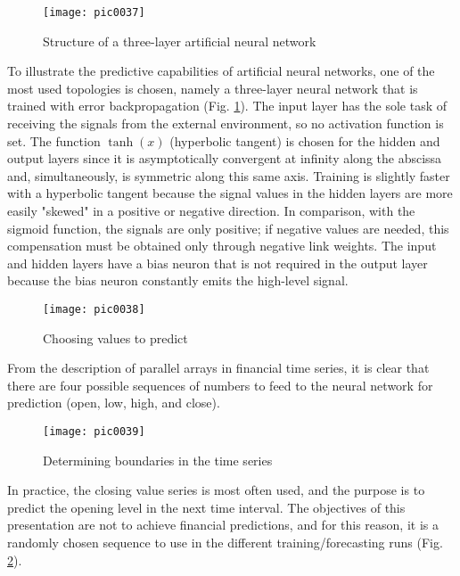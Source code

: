 \begin{figure}[h]
\centering
\texttt{[image: pic0037]}
\caption{Structure of a three-layer artificial neural network}
\label{fig:pic0037}
\end{figure}
\FloatBarrier

To illustrate the predictive capabilities of artificial neural networks, one of the most used topologies is chosen, namely a three-layer neural network that is trained with error backpropagation (Fig. \ref{fig:pic0037}). The input layer has the sole task of receiving the signals from the external environment, so no activation function is set. The function $\tanh( x )$ (hyperbolic tangent) is chosen for the hidden and output layers since it is asymptotically convergent at infinity along the abscissa and, simultaneously, is symmetric along this same axis. Training is slightly faster with a hyperbolic tangent because the signal values in the hidden layers are more easily "skewed" in a positive or negative direction. In comparison, with the sigmoid function, the signals are only positive; if negative values are needed, this compensation must be obtained only through negative link weights. The input and hidden layers have a bias neuron that is not required in the output layer because the bias neuron constantly emits the high-level signal.

\begin{figure}[h]
\centering
\texttt{[image: pic0038]}
\caption{Choosing values to predict}
\label{fig:pic0038}
\end{figure}
\FloatBarrier

From the description of parallel arrays in financial time series, it is clear that there are four possible sequences of numbers to feed to the neural network for prediction (open, low, high, and close).

\begin{figure}[h]
\centering
\texttt{[image: pic0039]}
\caption{Determining boundaries in the time series}
\label{fig:pic0039}
\end{figure}
\FloatBarrier

In practice, the closing value series is most often used, and the purpose is to predict the opening level in the next time interval. The objectives of this presentation are not to achieve financial predictions, and for this reason, it is a randomly chosen sequence to use in the different training/forecasting runs (Fig. \ref{fig:pic0038}).

